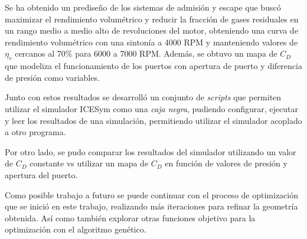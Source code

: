 Se ha obtenido un prediseño de los sistemas de admisión y escape que buscó
maximizar el rendimiento volumétrico y reducir la fracción de gases residuales
en un rango medio a medio alto de revoluciones del motor, obteniendo una curva
de rendimiento volumétrico con una sintonía a 4000 RPM y manteniendo valores de
$\eta_v$ cercanos al 70\% para 6000 a 7000 RPM.
%
Además, se obtuvo un mapa de $C_D$ que modeliza el funcionamiento de los
puertos con apertura de puerto y diferencia de presión como variables.

Junto con estos resultados se desarrolló un conjunto de \emph{scripts} que
permiten utilizar el simulador ICESym como una \emph{caja negra}, pudiendo
configurar, ejecutar y leer los resultados de una simulación, permitiendo
utilizar el simulador acoplado a otro programa.

Por otro lado, se pudo comparar los resultados del simulador utilizando un valor
de $C_{D}$ constante vs utilizar un mapa de $C_{D}$ en función de valores de
presión y apertura del puerto.

Como posible trabajo a futuro se puede continuar con el proceso de optimización
que se inició en este trabajo, realizando más iteraciones para refinar la
geometría obtenida.
%
Así como también explorar otras funciones objetivo para la optimización con el
algoritmo genético.
